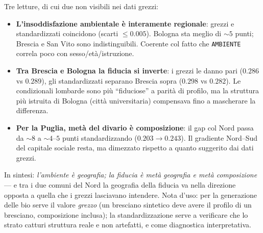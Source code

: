 \documentclass[11pt,a4paper]{article}
\newcommand{\code}[1]{\texttt{#1}}
\begin{document}
\noindent Tre letture, di cui due non visibili nei dati grezzi:
\begin{itemize}[leftmargin=*,itemsep=1pt]
  \item \textbf{L'insoddisfazione ambientale \`e interamente regionale}:
  grezzi e standardizzati coincidono (scarti $\le0.005$). Bologna sta
  meglio di $\sim5$ punti; Brescia e San Vito sono indistinguibili. Coerente
  col fatto che \code{AMBIENTE} correla poco con sesso/et\`a/istruzione.
  \item \textbf{Tra Brescia e Bologna la fiducia si inverte}: i grezzi le
  danno pari ($0.286$ vs $0.289$), gli standardizzati separano Brescia
  sopra ($0.298$ vs $0.282$). Le condizionali lombarde sono pi\`u
  ``fiduciose'' a parit\`a di profilo, ma la struttura pi\`u istruita di
  Bologna (citt\`a universitaria) compensava fino a mascherare la
  differenza.
  \item \textbf{Per la Puglia, met\`a del divario \`e composizione}: il gap
  col Nord passa da $\sim8$ a $\sim4$--$5$ punti standardizzando
  ($0.203\to0.243$). Il gradiente Nord--Sud del capitale sociale resta,
  ma dimezzato rispetto a quanto suggerito dai dati grezzi.
\end{itemize}
\noindent In sintesi: \emph{l'ambiente \`e geografia; la fiducia \`e
met\`a geografia e met\`a composizione} --- e tra i due comuni del Nord
la geografia della fiducia va nella direzione opposta a quella che i
grezzi lasciavano intendere. Nota d'uso: per la generazione delle bio
serve il valore \emph{grezzo} (un bresciano sintetico deve avere il
profilo di un bresciano, composizione inclusa); la standardizzazione
serve a verificare che lo strato catturi struttura reale e non artefatti,
e come diagnostica interpretativa.

\end{document}

